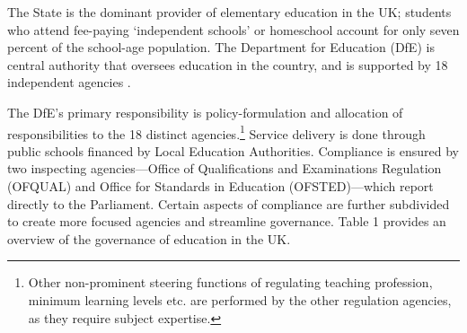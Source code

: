 \documentclass[a4paper, 12pt, twoside]{article}
\begin{document}
The State is the dominant provider of elementary education in the UK; students who attend fee-paying ‘independent schools’ or homeschool account for only seven percent of the school-age population. The Department for Education (DfE) is central authority that oversees education in the country, and is supported by 18 independent agencies \parencite{dfe}. 

The DfE’s primary responsibility is policy-formulation and allocation of responsibilities to the 18 distinct agencies.\footnote{Other non-prominent steering functions of regulating teaching profession, minimum learning levels etc. are performed by the other regulation agencies, as they require subject expertise.} Service delivery is done through public schools financed by Local Education Authorities. Compliance is ensured by two inspecting agencies—Office of Qualifications and Examinations Regulation (OFQUAL) and Office for Standards in Education (OFSTED)—which report directly to the Parliament. Certain aspects of compliance are further subdivided to create more focused agencies and streamline governance. Table 1 provides an overview of the governance of education in the UK.
\end{document}
